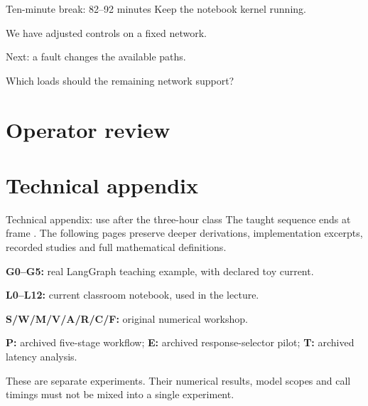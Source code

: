 



\begin{frame}{Ten-minute break: 82--92 minutes}
\centering\Large Keep the notebook kernel running.\par\bigskip
\normalsize We have adjusted controls on a fixed network.\par\medskip
Next: a fault changes the available paths.\par\medskip
Which loads should the remaining network support?
\end{frame}


\section{Operator review}




\ifdefined\LectureOnly\else
\appendix
\def\InClassroomAppendix{1}
\section{Technical appendix}
\begin{frame}{Technical appendix: use after the three-hour class}
\small
The taught sequence ends at frame \LectureFrameCount. The following pages preserve deeper derivations, implementation excerpts, recorded studies and full mathematical definitions.\par\medskip
\textbf{G0--G5:} real LangGraph teaching example, with declared toy current.\par\smallskip
\textbf{L0--L12:} current classroom notebook, used in the lecture.\par\medskip
\textbf{S/W/M/V/A/R/C/F:} original numerical workshop.\par\medskip
\textbf{P:} archived five-stage workflow; \textbf{E:} archived response-selector pilot; \textbf{T:} archived latency analysis.\par\medskip
These are separate experiments. Their numerical results, model scopes and call timings must not be mixed into a single experiment.
\end{frame}

\fi

